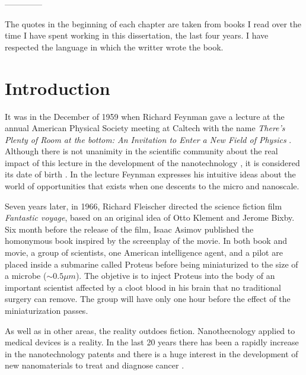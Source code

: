 \documentclass[b5paper,openright,10pt]{book}
\begin{document}
--------------

The quotes in the beginning of each chapter are taken from books I read over the time I have spent working in this dissertation, the last four years. I have respected the language in which the writter wrote the book. 

\setcounter{chapter}{-1}
\chapter{Introduction}
\label{Introduction}
\pagestyle{chapters}  %

It was in the December of 1959 when Richard Feynman gave a lecture at the annual American Physical Society meeting at Caltech with the name {\it There's Plenty of Room at the bottom: An Invitation to Enter a New Field of Physics} \cite{Feynman1960}. 
Although there is not unanimity in the scientific community about the real impact of this lecture in the development of the nanotechnology \cite{Nature2009}, it is considered its date of birth \cite{Tourney2008}. 
In the lecture Feynman expresses his intuitive ideas about the world of opportunities that exists when one descents to the micro and nanoscale. 

Seven years later, in 1966, Richard Fleischer directed the science fiction film {\it Fantastic voyage}, based on an original idea of Otto Klement and Jerome Bixby. 
Six month before the release of the film, Isaac Asimov published the homonymous book \cite{Asimov1966} inspired by the screenplay of the movie.  
In both book and movie, a group of scientists, one American intelligence agent, and a pilot are placed inside a submarine called Proteus before being miniaturized to the size of a microbe ($\sim 0.5 \mu m$). The objetive is to inject Proteus into the body of an important scientist affected by a cloot blood in his brain that no traditional surgery can remove. The group will have only one hour before the effect of the miniaturization passes.  

As well as in other areas, the reality outdoes fiction. 
Nanothecnology applied to medical devices is a reality. In the last 20 years there has been a rapidly increase in the nanotechnology patents \cite{Zheng2014} and there is a huge interest in the development of new nanomaterials to treat and diagnose cancer \cite{Nazir2014, Dreaden2012, Kievit2011}. 
\end{document}
